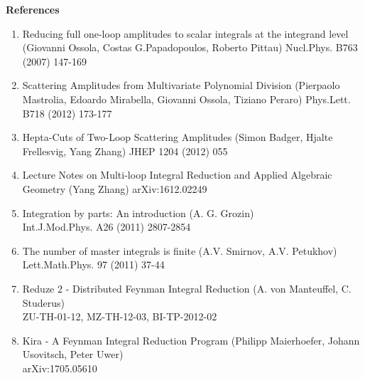 \documentclass[10pt]{article}
\begin{document}
\textbf{References}

\begin{enumerate}

\item Reducing full one-loop amplitudes to scalar integrals at the integrand level
(Giovanni Ossola, Costas G.Papadopoulos, Roberto Pittau)
Nucl.Phys. B763 (2007) 147-169

\item Scattering Amplitudes from Multivariate Polynomial Division
(Pierpaolo Mastrolia, Edoardo Mirabella, Giovanni Ossola, Tiziano Peraro)
Phys.Lett. B718 (2012) 173-177

\item Hepta-Cuts of Two-Loop Scattering Amplitudes
(Simon Badger, Hjalte Frellesvig, Yang Zhang)
JHEP 1204 (2012) 055

\item Lecture Notes on Multi-loop Integral Reduction and Applied Algebraic Geometry
(Yang Zhang) 
arXiv:1612.02249

\item Integration by parts: An introduction 
(A. G. Grozin)\\
Int.J.Mod.Phys. A26 (2011) 2807-2854

\item The number of master integrals is finite
(A.V. Smirnov, A.V. Petukhov)\\
Lett.Math.Phys. 97 (2011) 37-44

\item Reduze 2 - Distributed Feynman Integral Reduction
(A. von Manteuffel, C. Studerus)\\
ZU-TH-01-12, MZ-TH-12-03, BI-TP-2012-02

\item Kira - A Feynman Integral Reduction Program
(Philipp Maierhoefer, Johann Usovitsch, Peter Uwer) \\
arXiv:1705.05610

\end{enumerate}
\end{document}
